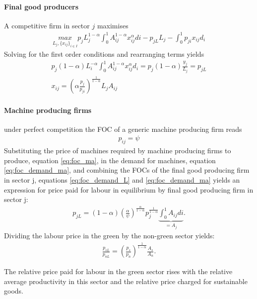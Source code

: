 \paragraph{Final good producers}
A competitive firm in sector $j$ maximises
\begin{align*}
\underset{L_j, \{x_{ij}\}_{i \in I}}{max} p_{j} L_j^{1-\alpha} \int_{0}^{1}A_{ij}^{1-\alpha}x_{ij}^\alpha di - p_{jL} L_j - \int_{0}^{1} p_{ji}x_{ij} d_i
\end{align*}
Solving for the first order conditions and rearranging terms yields
\begin{align}
p_j(1-\alpha) L_i^{-\alpha}\int_{0}^{1}A_{ij}^{1-\alpha}x_{ij}^\alpha d_i= p_j (1-\alpha)\frac{y_j}{L_j}=p_{jL}\label{eq:foc_demand_L}
\\
x_{ij} = \left(\alpha\frac{p_j}{p_{ji}}\right)^\frac{1}{1-\alpha}L_j A_{ij}\label{eq:foc_demand_ma}
\end{align}

\paragraph{Machine producing firms}
under perfect competition the FOC of a generic machine producing firm reads
\begin{align}\label{eq:foc_ma}
p_{ij}=\psi
\end{align}
Substituting the price of machines required by machine producing firms to produce,  equation \ref{eq:foc_ma}, in the demand for machines, equation \ref{eq:foc_demand_ma}, and combining the FOCs of the final good producing firm in sector j, equations \ref{eq:foc_demand_L} and \ref{eq:foc_demand_ma} yields an expression for price paid for labour in equilibrium by final good producing firm in sector j:
\begin{align}
p_{jL}= (1-\alpha)\left(\frac{\alpha}{\psi}\right)^\frac{\alpha}{1-\alpha}p_j^\frac{1}{1-\alpha}\underbrace{\int_{0}^{1} A_{ij} di}_{=A_j}.
\end{align}
Dividing the labour price in the green by the non-green sector yields:
\begin{align}
\frac{p_{sL}}{p_{nL}}= \left(\frac{p_s}{p_n}\right)^\frac{1}{1-\alpha} \frac{A_s}{A_n}.\label{eq:firms_labrel}
\end{align}

The relative price paid for labour in the green sector rises with the relative average productivity in this sector and the relative price charged for sustainable goods. 

